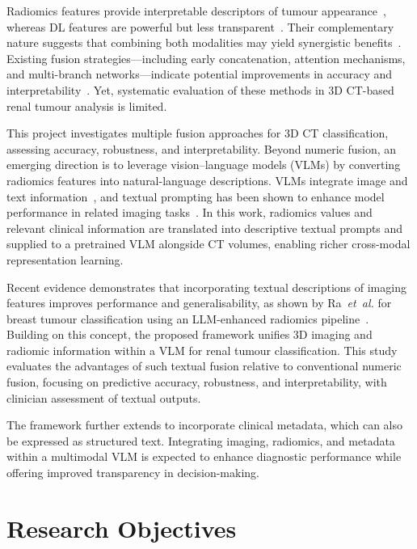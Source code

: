 \documentclass[final,british,a4paper,12pt]{phdthesis}
\begin{document}
Radiomics features provide interpretable descriptors of tumour appearance~\cite{radiomics2,radiomics3}, whereas DL features are powerful but less transparent~\cite{DL,DLradiology,radiomicsDL}. Their complementary nature suggests that combining both modalities may yield synergistic benefits~\cite{huang2020fusion,stahlschmidt2022,sharma2021medfusenet}. Existing fusion strategies—including early concatenation, attention mechanisms, and multi-branch networks—indicate potential improvements in accuracy and interpretability~\cite{huang2020fusion}. Yet, systematic evaluation of these methods in 3D CT-based renal tumour analysis is limited.

This project investigates multiple fusion approaches for 3D CT classification, assessing accuracy, robustness, and interpretability. Beyond numeric fusion, an emerging direction is to leverage vision–language models (VLMs) by converting radiomics features into natural-language descriptions. VLMs integrate image and text information~\cite{Wu2025,Akinci2025}, and textual prompting has been shown to enhance model performance in related imaging tasks~\cite{Avci2025}. In this work, radiomics values and relevant clinical information are translated into descriptive textual prompts and supplied to a pretrained VLM alongside CT volumes, enabling richer cross-modal representation learning.

Recent evidence demonstrates that incorporating textual descriptions of imaging features improves performance and generalisability, as shown by Ra~\textit{et~al.} for breast tumour classification using an LLM-enhanced radiomics pipeline~\cite{Ra2025}. Building on this concept, the proposed framework unifies 3D imaging and radiomic information within a VLM for renal tumour classification. This study evaluates the advantages of such textual fusion relative to conventional numeric fusion, focusing on predictive accuracy, robustness, and interpretability, with clinician assessment of textual outputs.

The framework further extends to incorporate clinical metadata, which can also be expressed as structured text. Integrating imaging, radiomics, and metadata within a multimodal VLM is expected to enhance diagnostic performance while offering improved transparency in decision-making.


\section{Research Objectives}\label{sec:research_objectives}
\end{document}
